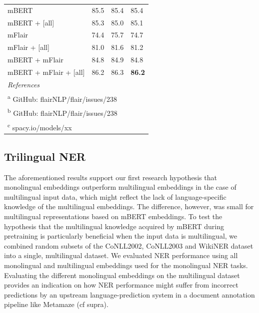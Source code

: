 \documentclass[12pt,a4paper,]{book}
\begin{document}
\begin{table}
\begin{tabular}[t]{llll}
\hspace{1em}mBERT & 85.5 & 85.4 & 85.4\\
\hspace{1em}mBERT + [all] & 85.3 & 85.0 & 85.1\\
\hspace{1em}mFlair & 74.4 & 75.7 & 74.7\\
\hspace{1em}mFlair + [all] & 81.0 & 81.6 & 81.2\\
\hspace{1em}mBERT + mFlair & 84.8 & 84.9 & 84.8\\
\hspace{1em}mBERT + mFlair + [all] & 86.2 & 86.3 & \textbf{86.2}\\
\bottomrule
\multicolumn{4}{l}{\textit{References}}\\
\multicolumn{4}{l}{\textsuperscript{a} GitHub: flairNLP/flair/issues/238}\\
\multicolumn{4}{l}{\textsuperscript{b} GitHub: flairNLP/flair/issues/238}\\
\multicolumn{4}{l}{\textsuperscript{c} spacy.io/models/xx}\\
\end{tabular}
\end{table}



\hypertarget{trilingual-ner}{%
\subsection{Trilingual NER}\label{trilingual-ner}}

The aforementioned results support our first research hypothesis that monolingual embeddings outperform multilingual embeddings in the case of multilingual input data, which might reflect the lack of language-specific knowledge of the multilingual embeddings. The difference, however, was small for multilingual representations based on mBERT embeddings. To test the hypothesis that the multilingual knowledge acquired by mBERT during pretraining is particularly beneficial when the input data is multilingual, we combined random subsets of the CoNLL2002, CoNLL2003 and WikiNER dataset into a single, multilingual dataset. We evaluated NER performance using all monolingual and multilingual embeddings used for the monolingual NER tasks. Evaluating the different monolingual embeddings on the multilingual dataset provides an indication on how NER performance might suffer from incorrect predictions by an upstream language-prediction system in a document annotation pipeline like Metamaze (cf supra).
\end{document}
